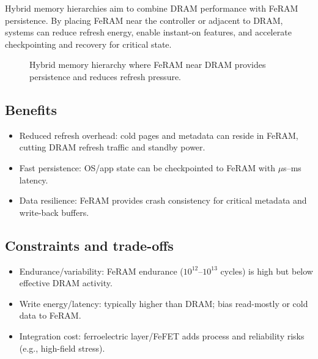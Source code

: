 Hybrid memory hierarchies aim to combine DRAM performance with FeRAM persistence.
By placing FeRAM near the controller or adjacent to DRAM, systems can reduce refresh
energy, enable instant-on features, and accelerate checkpointing and recovery
for critical state.

\begin{figure}[!t]
  \centering
  \caption{Hybrid memory hierarchy where FeRAM near DRAM provides persistence and reduces refresh pressure.}
  \label{fig:hybrid_hierarchy}
\end{figure}

\subsection*{Benefits}
\begin{itemize}
  \item Reduced refresh overhead: cold pages and metadata can reside in FeRAM, cutting DRAM refresh traffic and standby power.
  \item Fast persistence: OS/app state can be checkpointed to FeRAM with $\mu$s–ms latency.
  \item Data resilience: FeRAM provides crash consistency for critical metadata and write-back buffers.
\end{itemize}

\subsection*{Constraints and trade-offs}
\begin{itemize}
  \item Endurance/variability: FeRAM endurance ($10^{12}$--$10^{13}$ cycles) is high but below effective DRAM activity.
  \item Write energy/latency: typically higher than DRAM; bias read-mostly or cold data to FeRAM.
  \item Integration cost: ferroelectric layer/FeFET adds process and reliability risks (e.g., high-field stress).
\end{itemize}


